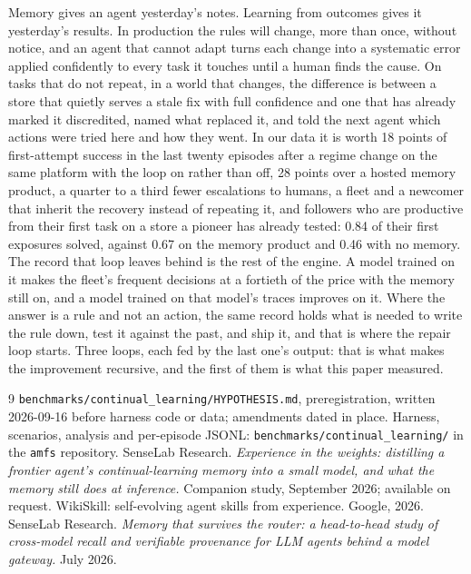 \documentclass[11pt]{article}
\begin{document}
Memory gives an agent yesterday's notes. Learning from outcomes gives it yesterday's results. In
production the rules will change, more than once, without notice, and an agent that cannot
adapt turns each change into a systematic error applied confidently to every task it touches
until a human finds the cause. On tasks that do not repeat, in a world that changes, the
difference is between a store that quietly serves a stale fix with full confidence and one
that has already marked it discredited, named what replaced it, and told the next agent which
actions were tried here and how they went. In our data it is worth 18 points of first-attempt success in the last twenty episodes
after a regime change on the same platform with the loop on rather than off, 28 points over a
hosted memory product, a quarter to a third fewer escalations to humans, a fleet and a newcomer
that inherit the recovery instead of repeating it, and followers who are productive from their
first task on a store a pioneer has already tested: 0.84 of their first exposures solved,
against 0.67 on the memory product and 0.46 with no memory. The record that loop leaves behind
is the rest of the engine. A model trained on it makes the fleet's frequent decisions at a
fortieth of the price with the memory still on, and a model trained on that model's traces
improves on it. Where the answer is a rule and not an action, the same record holds what is
needed to write the rule down, test it against the past, and ship it, and that is where the
repair loop starts. Three loops, each fed by the last one's output: that is what makes the
improvement recursive, and the first of them is what this paper measured.

\begin{thebibliography}{9}
 \texttt{benchmarks/continual\_learning/HYPOTHESIS.md}, preregistration,
  written 2026-09-16 before harness code or data; amendments dated in place.
 Harness, scenarios, analysis and per-episode JSONL:
  \texttt{benchmarks/continual\_learning/} in the \texttt{amfs} repository.
 SenseLab Research. \emph{Experience in the weights: distilling a frontier
  agent's continual-learning memory into a small model, and what the memory still does at
  inference.} Companion study, September 2026; available on request.
 WikiSkill: self-evolving agent skills from experience. Google, 2026.
 SenseLab Research. \emph{Memory that survives the router: a head-to-head study
  of cross-model recall and verifiable provenance for LLM agents behind a model gateway.} July 2026.
\end{thebibliography}
\end{document}
